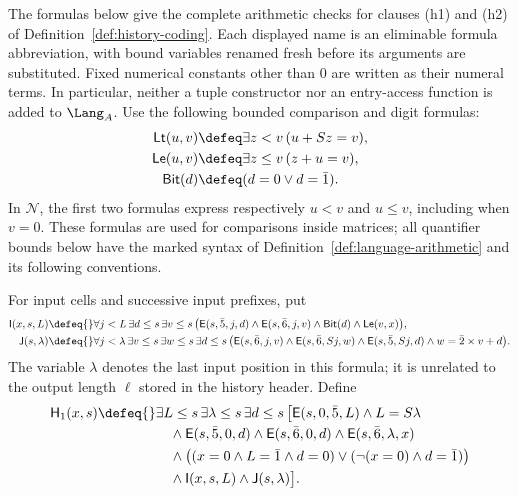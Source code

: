 \begin{definition}
\label{def:p04-input-table-formulas}
The formulas below give the complete arithmetic checks for clauses
(h1) and (h2) of Definition~\ref{def:history-coding}.  Each displayed
name is an eliminable formula abbreviation, with bound variables renamed
fresh before its arguments are substituted.  Fixed numerical constants
other than \(0\) are written as their numeral terms.  In particular,
neither a tuple constructor nor an entry-access function is added to
\(\Lang_A\).  Use the following bounded comparison and digit formulas:
\[
\begin{aligned}
 \mathsf{Lt}(u,v)&\defeq\exists z<v\,(u+Sz=v),\\
 \mathsf{Le}(u,v)&\defeq\exists z\leq v\,(z+u=v),\\
 \mathsf{Bit}(d)&\defeq(d=0\lor d=\bar1).
\end{aligned}
\]
In \(\mathcal N\), the first two formulas express respectively
\(u<v\) and \(u\leq v\), including when \(v=0\).  These formulas
are used for comparisons inside matrices; all quantifier bounds below
have the marked syntax of Definition~\ref{def:language-arithmetic}
and its following conventions.

For input cells and successive input prefixes, put
\[
\begin{aligned}
 \mathsf I(x,s,L)\defeq{}&
  \forall j<L\,\exists d\leq s\,\exists v\leq s\,
   \bigl(\mathsf E(s,\bar5,j,d)\land
         \mathsf E(s,\bar6,j,v)\land
         \mathsf{Bit}(d)\land\mathsf{Le}(v,x)\bigr),\\
 \mathsf J(s,\lambda)\defeq{}&
  \forall j<\lambda\,\exists v\leq s\,\exists w\leq s\,
  \exists d\leq s\,
   \bigl(\mathsf E(s,\bar6,j,v)\land
         \mathsf E(s,\bar6,Sj,w)\land
         \mathsf E(s,\bar5,Sj,d)\land
         w=\bar2\times v+d\bigr).
\end{aligned}
\]
The variable \(\lambda\) denotes the last input position in this
formula; it is unrelated to the output length \(\ell\) stored in
the history header.  Define
\[
\begin{aligned}
 \mathsf H_1(x,s)\defeq{}&
  \exists L\leq s\,\exists\lambda\leq s\,\exists d\leq s\,
  \bigl[\mathsf E(s,0,\bar5,L)\land L=S\lambda\\
 &\quad\land\mathsf E(s,\bar5,0,d)
       \land\mathsf E(s,\bar6,0,d)
       \land\mathsf E(s,\bar6,\lambda,x)\\
 &\quad\land\bigl((x=0\land L=\bar1\land d=0)
              \lor(\neg(x=0)\land d=\bar1)\bigr)\\
 &\quad\land\mathsf I(x,s,L)\land\mathsf J(s,\lambda)\bigr].
\end{aligned}
\]


\end{definition}
